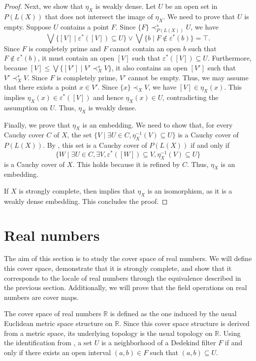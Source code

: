 \documentclass[reqno]{amsart}
\theoremstyle{definition}
\theoremstyle{remark}
\numberwithin{figure}{section}
\newcommand{\rb}{\prec}
\begin{document}
\begin{proof}
Next, we show that $\eta_X$ is weakly dense.
Let $U$ be an open set in $P(L(X))$ that does not intersect the image of $\eta_X$.
We need to prove that $U$ is empty.
Suppose $U$ contains a point $F$.
Since $\{ F \} \rb^s_{P(L(X))} U$, we have 
\[
\bigvee \{ [V] \mid \varepsilon^*([V]) \subseteq U \} \vee \bigvee \{ b \mid F \notin \varepsilon^*(b) \} = \top.
\]
Since $F$ is completely prime and $F$ cannot contain an open $b$ such that $F \notin \varepsilon^*(b)$, it must contain an open $[V]$ such that $\varepsilon^*([V]) \subseteq U$.
Furthermore, because $[V] \leq \bigvee \{ [V'] \mid V' \rb^s_X V \}$, it also contains an open $[V']$ such that $V' \rb^s_X V$.
Since $F$ is completely prime, $V'$ cannot be empty.
Thus, we may assume that there exists a point $x \in V'$.
Since $\{ x \} \rb_X V$, we have $[V] \in \eta_X(x)$.
This implies $\eta_X(x) \in \varepsilon^*([V])$ and hence $\eta_X(x) \in U$, contradicting the assumption on $U$.
Thus, $\eta_X$ is weakly dense.

Finally, we prove that $\eta_X$ is an embedding.
We need to show that, for every Cauchy cover $C$ of $X$, the set $\{ V \mid \exists U \in C, \eta_X^{-1}(V) \subseteq U \}$ is a Cauchy cover of $P(L(X))$.
By , this set is a Cauchy cover of $P(L(X))$ if and only if 
\[
\{ W \mid \exists U \in C, \exists V, \varepsilon^*([W]) \subseteq V, \eta_X^{-1}(V) \subseteq U \}
\]
is a Cauchy cover of $X$.
This holds because it is refined by $C$.
Thus, $\eta_X$ is an embedding.

If $X$ is strongly complete, then  implies that $\eta_X$ is an isomorphism, as it is a weakly dense embedding.
This concludes the proof.
\end{proof}

\section{Real numbers}
\label{sec:reals}

The aim of this section is to study the cover space of real numbers.
We will define this cover space, demonstrate that it is strongly complete, and show that it corresponds to the locale of real numbers through the equivalence described in the previous section.
Additionally, we will prove that the field operations on real numbers are cover maps.

The cover space of real numbers $\mathbb{R}$ is defined as the one induced by the usual Euclidean metric space structure on $\mathbb{R}$.
Since this cover space structure is derived from a metric space, its underlying topology is the usual topology on $\mathbb{R}$.
Using the identification from , a set $U$ is a neighborhood of a Dedekind filter $F$ if and only if there exists an open interval $(a,b) \in F$ such that $(a,b) \subseteq U$.
\end{document}
